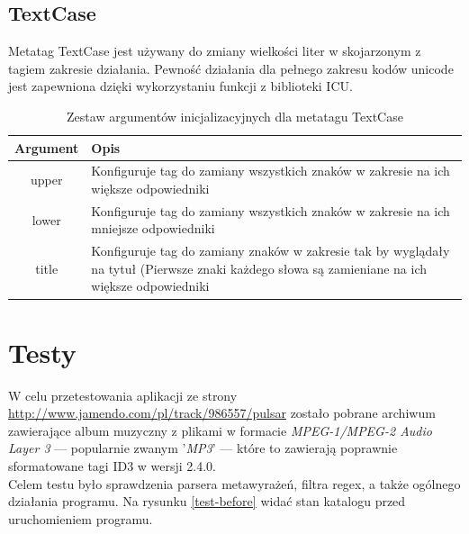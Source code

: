 \subsection{TextCase}
Metatag TextCase jest używany do zmiany wielkości liter w skojarzonym z tagiem zakresie działania. Pewność działania dla pełnego zakresu kodów unicode jest zapewniona dzięki wykorzystaniu funkcji z biblioteki ICU.



\begin{table}[h]
\begin{center}
\begin{tabular}{| c | p{13cm} |}
\hline
\textbf{Argument} & \textbf{Opis} \\
\hline
upper & Konfiguruje tag do zamiany wszystkich znaków w zakresie na ich większe odpowiedniki \\
lower & Konfiguruje tag do zamiany wszystkich znaków w zakresie na ich mniejsze odpowiedniki \\
title & Konfiguruje tag do zamiany znaków w zakresie tak by wyglądały na tytuł (Pierwsze znaki każdego słowa są zamieniane na ich większe odpowiedniki \\
\hline
\end{tabular} \end{center}
\caption{Zestaw argumentów inicjalizacyjnych dla metatagu TextCase}
\end{table}

\section{Testy}
\label{testy}

\par
W celu przetestowania aplikacji ze strony \url{http://www.jamendo.com/pl/track/986557/pulsar} zostało pobrane archiwum zawierające album muzyczny z plikami w formacie \textit{MPEG-1/MPEG-2 Audio Layer 3} --- popularnie zwanym '\textit{MP3}' --- które to zawierają poprawnie sformatowane tagi ID3 w wersji 2.4.0.\\
Celem testu było sprawdzenia parsera metawyrażeń, filtra regex, a także ogólnego działania programu.
Na rysunku \ref{test-before} widać stan katalogu przed uruchomieniem programu.


